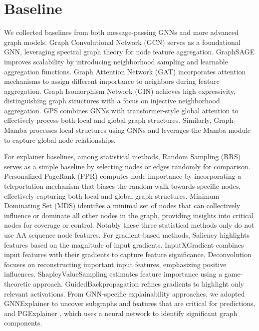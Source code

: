 \section{Baseline}
\label{app:gnnbaseline}

We collected baselines from both message-passing GNNs and more advanced graph models. 
Graph Convolutional Network (GCN) \cite{GCN} serves as a foundational GNN, leveraging spectral graph theory for node feature aggregation. 
GraphSAGE \cite{GraphSAGE} improves scalability by introducing neighborhood sampling and learnable aggregation functions. 
Graph Attention Network (GAT) \cite{GAT} incorporates attention mechanisms to assign different importance to neighbors during feature aggregation. 
Graph Isomorphism Network (GIN) \cite{GIN} achieves high expressivity, distinguishing graph structures with a focus on injective neighborhood aggregation. 
GPS \cite{GPS} combines GNNs with transformer-style global attention to effectively process both local and global graph structures. 
Similarly, Graph-Mamba \cite{Geraph-Mamba} processes local structures using GNNs and leverages the Mamba module to capture global node relationships.

For explainer baselines, among statistical methods, Random Sampling (RRS) \cite{10.1093/bioinformatics/bth163} serves as a simple baseline by selecting nodes or edges randomly for comparison. 
Personalized PageRank (PPR) \cite{PMID:21149343} computes node importance by incorporating a teleportation mechanism that biases the random walk towards specific nodes, effectively capturing both local and global graph structures. 
Minimum Dominating Set (MDS) \cite{NACHER201657, doi:10.1073/pnas.1311231111} identifies a minimal set of nodes that can collectively influence or dominate all other nodes in the graph, providing insights into critical nodes for coverage or control.
Notably these three statistical methods only do not use AA sequence node features.
For gradient-based methods, 
Saliency \cite{saliency} highlights features based on the magnitude of input gradients. 
InputXGradient \cite{InputXGradient} combines input features with their gradients to capture feature significance. 
Deconvolution \cite{deconvolustion} focuses on reconstructing important input features, emphasizing positive influences. 
ShapleyValueSampling \cite{shapley} estimates feature importance using a game-theoretic approach. 
GuidedBackpropagation \cite{guidedbackpropagation} refines gradients to highlight only relevant activations.
From GNN-specific explainability approaches, we adopted GNNExplainer \cite{gnnexplainer} to uncover subgraphs and features that are critical for predictions, and PGExplainer \cite{pgexplainer}, which uses a neural network to identify significant graph components.


